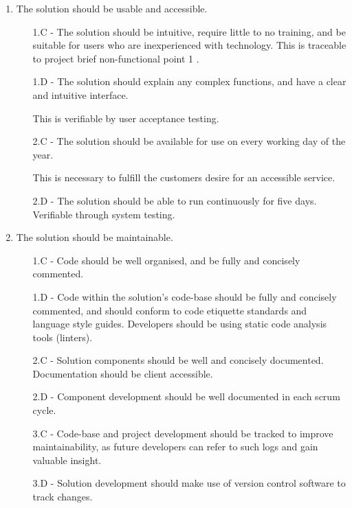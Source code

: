 \documentclass[9pt, titlepage]{extarticle}
\begin{document}
\begin{enumerate}[leftmargin=*]
\begin{enumerate}[noitemsep, topsep=0pt, leftmargin=9mm]
\end{enumerate}

\item The solution should be usable and accessible.
\begin{enumerate}[noitemsep, topsep=0pt, leftmargin=9mm]
 \item[1.C -] The solution should be intuitive, require little to no training, and be suitable for users who are inexperienced with technology. This is traceable to project brief non-functional point 1 \autocite{web:spec}. 
 \item[1.D -] The solution should explain any complex functions, and have a clear and intuitive interface.
 \item[] This is verifiable by user acceptance testing.
 \vspace*{1mm}
 \item[2.C -] The solution should be available for use on every working day of the year. 
  \item[] This is necessary to fulfill the customers desire for an accessible service.
 \item[2.D -] The solution should be able to run continuously for five days. Verifiable through system testing.
\end{enumerate}

\item The solution should be maintainable.
\begin{enumerate}[noitemsep, topsep=0pt, leftmargin=9mm]
 \item[1.C -] Code should be well organised, and be fully and concisely commented.
 \item[1.D -] Code within the solution's code-base should be fully and concisely commented, and should conform to code etiquette standards and language style guides.
 Developers should be using static code analysis tools (linters).\vspace*{1mm}
 \item[2.C -] Solution components should be well and concisely documented. Documentation should be client accessible.
 \item[2.D -] Component development should be well documented in each scrum cycle. 
 \vspace*{1mm}
 \item[3.C -] Code-base and project development should be tracked to improve maintainability, as future developers can refer to such logs and gain valuable insight.
 \item[3.D -] Solution development should make use of version control software to track changes.
\end{enumerate}


\end{enumerate}
\end{document}
